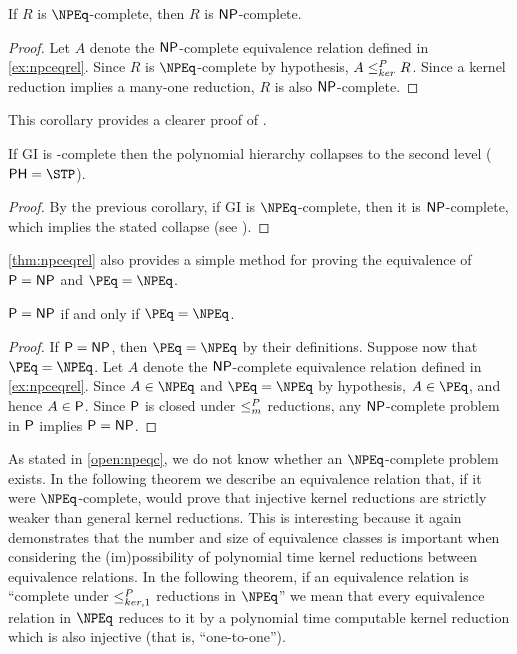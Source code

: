 \begin{corollary}
  If $R$ is $\NPEq$-complete, then $R$ is $\NP$-complete.
\end{corollary}
\begin{proof}
  Let $A$ denote the $\NP$-complete equivalence relation defined in \autoref{ex:npceqrel}.
  Since $R$ is $\NPEq$-complete by hypothesis, $A \kr R$.
  Since a kernel reduction implies a many-one reduction, $R$ is also $\NP$-complete.
\end{proof}

This corollary provides a clearer proof of \autocite[Proposition~8.1]{bcffm}.

\begin{corollary}
  If \textsc{GI} is \NPEq-complete then the polynomial hierarchy collapses to the second level ($\PH = \STP$).
\end{corollary}
\begin{proof}
  By the previous corollary, if \textsc{GI} is $\NPEq$-complete, then it is $\NP$-complete, which implies the stated collapse (see \autocite{schoning87}).
\end{proof}

\autoref{thm:npceqrel} also provides a simple method for proving the equivalence of $\P = \NP$ and $\PEq = \NPEq$.

\begin{theorem}\label{thm:pnppeqnpeq}
  $\P = \NP$ if and only if $\PEq = \NPEq$.
\end{theorem}
\begin{proof}
  If $\P = \NP$, then $\PEq = \NPEq$ by their definitions.
  Suppose now that $\PEq = \NPEq$.
  Let $A$ denote the $\NP$-complete equivalence relation defined in \autoref{ex:npceqrel}.
  Since $A \in \NPEq$ and $\PEq = \NPEq$ by hypothesis, $A \in \PEq$, and hence $A \in \P$.
  Since $\P$ is closed under $\mor$ reductions, any $\NP$-complete problem in $\P$ implies $\P = \NP$.
\end{proof}

As stated in \autoref{open:npeqc}, we do not know whether an $\NPEq$-complete problem exists.
In the following theorem we describe an equivalence relation that, if it were $\NPEq$-complete, would prove that injective kernel reductions are strictly weaker than general kernel reductions.
This is interesting because it again demonstrates that the number and size of equivalence classes is important when considering the (im)possibility of polynomial time kernel reductions between equivalence relations.
In the following theorem, if an equivalence relation is ``complete under $\kri$ reductions in $\NPEq$'' we mean that every equivalence relation in $\NPEq$ reduces to it by a polynomial time computable kernel reduction which is also injective (that is, ``one-to-one'').

